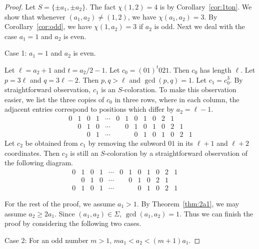 \documentclass[11pt]{amsart}
\theoremstyle{definition}
\begin{document}
\begin{proof} Let $S=\{\pm a_1, \pm a_2\}$. The fact $\chi(1,2)=4$ is by Corollary~\ref{cor:1ton}. We show that whenever $(a_1, a_2)\neq (1,2)$, we have $\chi(a_1, a_2)=3$. By Corollary~\ref{cor:odd}, we have $\chi(1, a_2)=3$ if $a_2$ is odd. Next we deal with the case $a_1=1$ and $a_2$ is even.

Case 1: $a_1=1$ and $a_2$ is even. 

Let $\ell=a_2+1$ and $t=a_2/2-1$. Let $c_0=(01)^t021$. Then $c_0$ has length $\ell$. Let $p=3\ell$ and $q=3\ell-2$. Then $p, q>\ell$ and $\gcd(p,q)=1$. Let $c_1=c_0^3$. By straightforward observation, $c_1$ is an $S$-coloration. To make this observation easier, we list the three copies of $c_0$ in three rows, where in each column, the adjacent entries correspond to positions which differ by $a_2=\ell-1$.
$$ \begin{array}{rccccccccccccl}
0 & 1 & 0 & 1 & \cdots & 0 & 1 & 0 & 1 & 0 & 2 & 1 &  & \\
   & 0 & 1 & 0 & \cdots &    & 0 & 1 & 0 & 1 & 0 & 2 & 1 & \\
   &    & 0 & 1 & \cdots &    &    & 0 & 1 & 0 & 1 & 0 & 2 & 1
   \end{array}
   $$
Let $c_2$ be obtained from $c_1$ by removing the subword $01$ in its $\ell+1$ and $\ell+2$ coordinates. Then $c_2$ is still an $S$-coloration by a straightforward observation of the following diagram.
$$ \begin{array}{rccccccccccccl}
0 & 1 & 0 & 1 & \cdots & 0 & 1 & 0 & 1 & 0 & 2 & 1 &  & \\
   & 0 & 1 & 0 & \cdots &    & 0 & 1 & 0 & 2 & 1 &  &  & \\
0   &  1  & 0 & 1 & \cdots &    &    & 0 & 1 & 0 & 2 & 1 &  &
   \end{array}
   $$

For the rest of the proof, we assume $a_1>1$. By Theorem~\ref{thm:2a1}, we may assume $a_2\geq 2a_1$. Since $(a_1, a_2)\in\Sigma$, $\gcd(a_1, a_2)=1$. Thus we can finish the proof by considering the following two cases. 

Case 2: For an odd number $m>1$, $ma_1<a_2<(m+1)a_1$.


\end{proof}
\end{document}
